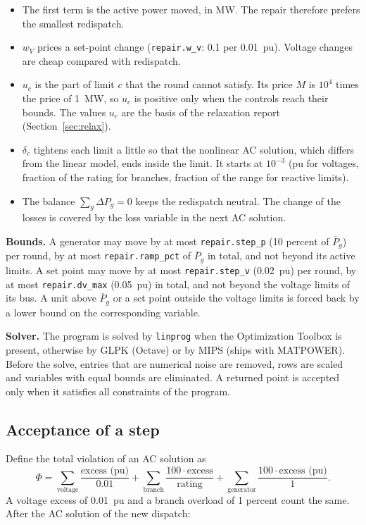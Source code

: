 \documentclass[a4paper,11pt]{article}
\newcommand{\opt}[1]{\texttt{#1}}
\begin{document}
\begin{itemize}[nosep]
  \item The first term is the active power moved, in MW. The repair therefore prefers the smallest redispatch.
  \item $w_V$ prices a set-point change (\opt{repair.w\_v}: 0.1 per 0.01~pu). Voltage changes are cheap compared with redispatch.
  \item $u_c$ is the part of limit $c$ that the round cannot satisfy. Its price $M$ is $10^4$ times the price of 1~MW, so $u_c$ is positive only when the controls reach their bounds. The values $u_c$ are the basis of the relaxation report (Section~\ref{sec:relax}).
  \item $\delta_c$ tightens each limit a little so that the nonlinear AC solution, which differs from the linear model, ends inside the limit. It starts at $10^{-3}$ (pu for voltages, fraction of the rating for branches, fraction of the range for reactive limits).
  \item The balance $\sum_g\Delta P_g=0$ keeps the redispatch neutral. The change of the losses is covered by the loss variable in the next AC solution.
\end{itemize}

\textbf{Bounds.} A generator may move by at most \opt{repair.step\_p} (10 percent of $\overline{P}_g$) per round, by at most \opt{repair.ramp\_pct} of $\overline{P}_g$ in total, and not beyond its active limits. A set point may move by at most \opt{repair.step\_v} (0.02~pu) per round, by at most \opt{repair.dv\_max} (0.05~pu) in total, and not beyond the voltage limits of its bus. A unit above $\overline{P}_g$ or a set point outside the voltage limits is forced back by a lower bound on the corresponding variable.

\textbf{Solver.} The program is solved by \texttt{linprog} when the Optimization Toolbox is present, otherwise by GLPK (Octave) or by MIPS (ships with MATPOWER). Before the solve, entries that are numerical noise are removed, rows are scaled and variables with equal bounds are eliminated. A returned point is accepted only when it satisfies all constraints of the program.

\subsection{Acceptance of a step}

Define the total violation of an AC solution as
\[
\Phi = \sum_{\text{voltage}} \frac{\text{excess (pu)}}{0.01} + \sum_{\text{branch}} \frac{100\cdot\text{excess}}{\text{rating}} + \sum_{\text{generator}} \frac{100\cdot\text{excess (pu)}}{1} .
\]
A voltage excess of 0.01~pu and a branch overload of 1 percent count the same. After the AC solution of the new dispatch:
\end{document}
